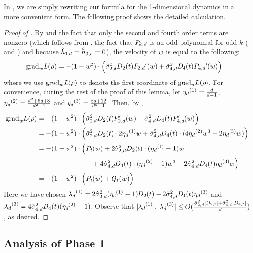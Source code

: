 In , we are simply rewriting our formula for the 1-dimensional dynamics in a more convenient form. The following proof shows the detailed calculation.

\begin{proof}[Proof of ]
By  and the fact that only the second and fourth order terms are nonzero (which follows from , the fact that ${P_{k, d}}$ is an odd polynomial for odd $k$ ( and ) and because $\hat{h}_{1, d} = \hat{h}_{3, d} = 0$), the velocity of $w$ is equal to the following:
\begin{align}
{\textup{grad}}_w L(\rho)
& = -(1 - w^2) \cdot \Big(\hat{\sigma}_{2, d}^2 D_2(t) {P_{2, d}}'(w) + \hat{\sigma}_{4, d}^2 D_4(t) {P_{4, d}}'(w) \Big)
\end{align}
where we use ${\textup{grad}}_w L(\rho)$ to denote the first coordinate of ${\textup{grad}}_u L(\rho)$. For convenience, during the rest of the proof of this lemma, let ${\eta_d}^{(1)} = \frac{d}{d - 1}$, ${\eta_d}^{(2)} = \frac{d^2 + 6d + 8}{d^2 - 1}$ and ${\eta_d}^{(3)} = \frac{6d + 12}{d^2 - 1}$. Then, by ,
\begin{align}
{\textup{grad}}_w L(\rho)
& = -(1 - w^2) \cdot \Big(\hat{\sigma}_{2, d}^2 D_2(t) P_{2, d}'(w) + \hat{\sigma}_{4, d}^2 D_4(t) P_{4, d}'(w) \Big) \\
& = -(1 - w^2) \cdot \Big(\hat{\sigma}_{2, d}^2 D_2(t) \cdot 2 {\eta_d}^{(1)} w + \hat{\sigma}_{4, d}^2 D_4(t) \cdot (4{\eta_d}^{(2)} w^3 - 2{\eta_d}^{(3)} w) \Big) \\
& = -(1 - w^2) \cdot \Big( P_t(w) + 2 \hat{\sigma}_{2, d}^2 D_2(t) \cdot ({\eta_d}^{(1)} - 1) w \\
& \,\,\,\,\,\,\,\,\,\,\,\,\,\,\,\,\,\,\,\,\,\,\,\,\,\,\,\,\,\,\,\,\,\,\,\,\,\,\,\,\,\,\,\,\,\,\,\, + 4 \hat{\sigma}_{4, d}^2 D_4(t) \cdot ({\eta_d}^{(2)} - 1) w^3 - 2 \hat{\sigma}_{4, d}^2 D_4(t) {\eta_d}^{(3)} w \Big) \\
& = -(1 - w^2) \cdot \Big(P_t(w) + Q_t(w) \Big)
\end{align}
Here we have chosen ${\lambda_d}^{(1)} = 2 \hat{\sigma}_{2, d}^2 ({\eta_d}^{(1)} - 1) D_2(t) - 2 \hat{\sigma}_{4, d}^2 D_4(t) {\eta_d}^{(3)}$ and ${\lambda_d}^{(3)} = 4 \hat{\sigma}_{4, d}^2 D_4(t) ({\eta_d}^{(2)} - 1)$. Observe that $|{\lambda_d}^{(1)}|, |{\lambda_d}^{(3)}| \leq O(\frac{\hat{\sigma}_{2, d}^2 |D_{2, t}| + \hat{\sigma}_{4, d}^2 |D_{4, t}|}{d})$, as desired.
\end{proof}

\subsection{Analysis of Phase 1}

